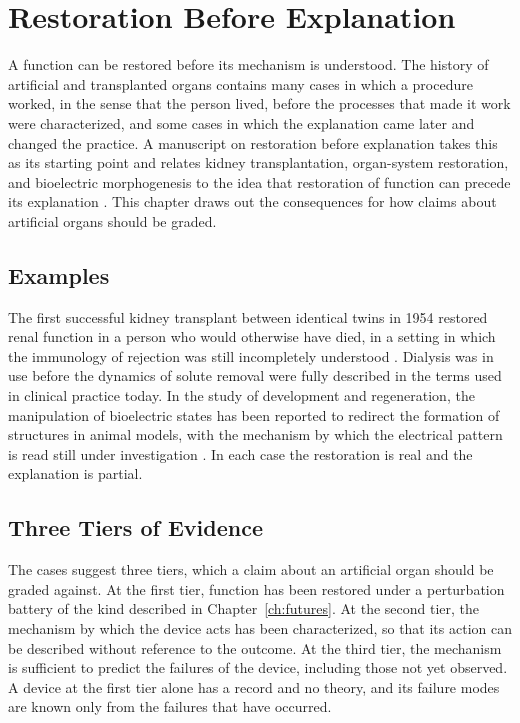 \documentclass[11pt,openany]{book}
\theoremstyle{definition}
\theoremstyle{remark}
\begin{document}
\chapter{Restoration Before Explanation}
\label{ch:restoration}

A function can be restored before its mechanism is understood. The history of artificial and transplanted organs contains many cases in which a procedure worked, in the sense that the person lived, before the processes that made it work were characterized, and some cases in which the explanation came later and changed the practice. A manuscript on restoration before explanation takes this as its starting point and relates kidney transplantation, organ-system restoration, and bioelectric morphogenesis to the idea that restoration of function can precede its explanation \cite{flyxion2026restoration}. This chapter draws out the consequences for how claims about artificial organs should be graded.

\section{Examples}

The first successful kidney transplant between identical twins in 1954 restored renal function in a person who would otherwise have died, in a setting in which the immunology of rejection was still incompletely understood \cite{merrill1956}. Dialysis was in use before the dynamics of solute removal were fully described in the terms used in clinical practice today. In the study of development and regeneration, the manipulation of bioelectric states has been reported to redirect the formation of structures in animal models, with the mechanism by which the electrical pattern is read still under investigation \cite{levin2021}. In each case the restoration is real and the explanation is partial.

\section{Three Tiers of Evidence}

The cases suggest three tiers, which a claim about an artificial organ should be graded against. At the first tier, function has been restored under a perturbation battery of the kind described in Chapter~\ref{ch:futures}. At the second tier, the mechanism by which the device acts has been characterized, so that its action can be described without reference to the outcome. At the third tier, the mechanism is sufficient to predict the failures of the device, including those not yet observed. A device at the first tier alone has a record and no theory, and its failure modes are known only from the failures that have occurred.
\end{document}
